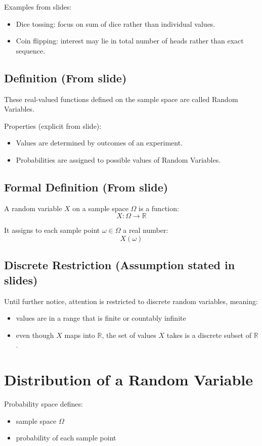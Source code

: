 \documentclass{article}
\begin{document}
Examples from slides:
\begin{itemize}
\item Dice tossing: focus on sum of dice rather than individual values.
\item Coin flipping: interest may lie in total number of heads rather than exact sequence.
\end{itemize}

\subsection{Definition (From slide)}
These real-valued functions defined on the sample space are called Random Variables.

Properties (explicit from slide):
\begin{itemize}
\item Values are determined by outcomes of an experiment.
\item Probabilities are assigned to possible values of Random Variables.
\end{itemize}

\subsection{Formal Definition (From slide)}
A random variable $X$ on a sample space $\Omega$ is a function:
\[
X:\Omega\to \mathbb{R}
\]

It assigns to each sample point $\omega\in\Omega$ a real number:
\[
X(\omega)
\]

\subsection{Discrete Restriction (Assumption stated in slides)}
Until further notice, attention is restricted to discrete random variables, meaning:
\begin{itemize}
\item values are in a range that is finite or countably infinite
\item even though $X$ maps into $\mathbb{R}$, the set of values $X$ takes is a discrete subset of $\mathbb{R}$.
\end{itemize}

\section{Distribution of a Random Variable}

Probability space defines:
\begin{itemize}
\item sample space $\Omega$
\item probability of each sample point
\end{itemize}
\end{document}
